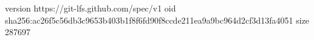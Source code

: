 version https://git-lfs.github.com/spec/v1
oid sha256:ac26f5c56db3c9653b403b1f8f6fd90f8ccde211ea9a9bc964d2cf3d13fa4051
size 287697
